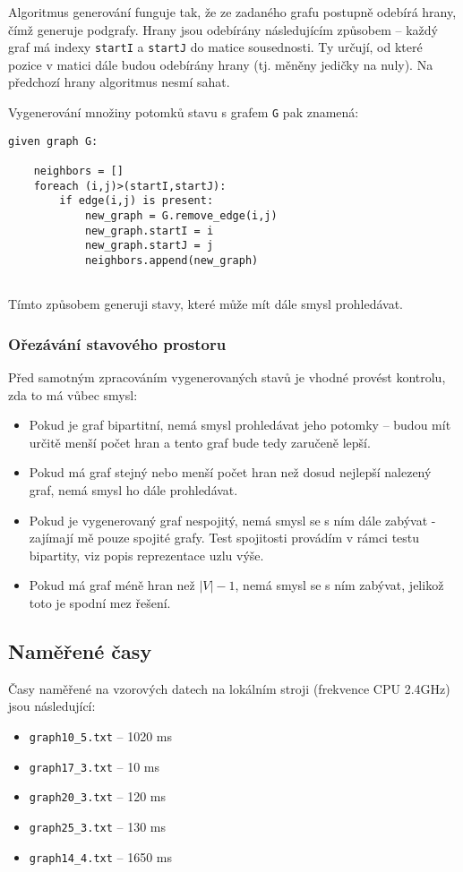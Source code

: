 \documentclass[czech]{article}
\begin{document}
Algoritmus generování funguje tak, že ze zadaného grafu postupně odebírá hrany, čímž generuje podgrafy. Hrany jsou odebírány následujícím způsobem -- každý graf má indexy \texttt{startI} a \texttt{startJ} do matice sousednosti. Ty určují, od které pozice v matici dále budou odebírány hrany (tj. měněny jedičky na nuly). Na předchozí hrany algoritmus nesmí sahat.

Vygenerování množiny potomků stavu s grafem \texttt{G} pak znamená:
\begin{lstlisting}[frame=single]
	given graph G:
	
	neighbors = []
	foreach (i,j)>(startI,startJ):
		if edge(i,j) is present:
			new_graph = G.remove_edge(i,j)
			new_graph.startI = i
			new_graph.startJ = j
			neighbors.append(new_graph)
			
\end{lstlisting}
Tímto způsobem generuji stavy, které může mít dále smysl prohledávat.


\subsubsection{Ořezávání stavového prostoru}
Před samotným zpracováním vygenerovaných stavů je vhodné provést kontrolu, zda to má vůbec smysl:
\begin{itemize}
	\item Pokud je graf bipartitní, nemá smysl prohledávat jeho potomky -- budou mít určitě menší počet hran a tento graf bude tedy zaručeně lepší.
	\item Pokud má graf stejný nebo menší počet hran než dosud nejlepší nalezený graf, nemá smysl ho dále prohledávat.
	\item Pokud je vygenerovaný graf nespojitý, nemá smysl se s ním dále zabývat - zajímají mě pouze spojité grafy. Test spojitosti provádím v rámci testu bipartity, viz popis reprezentace uzlu výše.
	\item Pokud má graf méně hran než $|V|-1$, nemá smysl se s ním zabývat, jelikož toto je spodní mez řešení.
\end{itemize}

\subsection{Naměřené časy}
Časy naměřené na vzorových datech na lokálním stroji (frekvence CPU 2.4GHz) jsou následující:

\begin{itemize}
	\item \texttt{graph10\_5.txt} -- 1020 ms
	\item \texttt{graph17\_3.txt} -- 10 ms
	\item \texttt{graph20\_3.txt} -- 120 ms
	\item \texttt{graph25\_3.txt} -- 130 ms
	\item \texttt{graph14\_4.txt} -- 1650 ms
\end{itemize}
\end{document}

